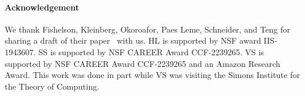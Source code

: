 \paragraph{Acknowledgement}
We thank Fishelson, Kleinberg, Okoroafor, Paes Leme, Schneider, and Teng for sharing a draft of their paper~\citep{fishelsonfull} with us.
HL is supported by NSF award IIS-1943607. SS is supported by NSF CAREER Award CCF-2239265. VS is supported by NSF CAREER Award CCF-2239265 and an Amazon Research Award. This work was done in part while VS was visiting the Simons Institute for the Theory of Computing.  
